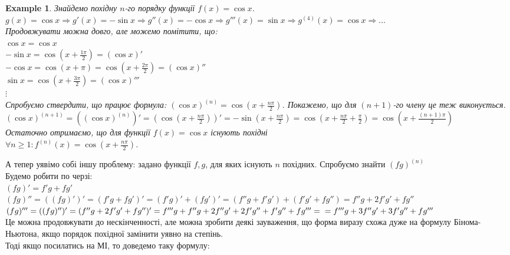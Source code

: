 \documentclass[a4paper, 14pt]{article}
\theoremstyle{theoremdd}
\theoremstyle{theoremdd}
\theoremstyle{theoremdd}
\theoremstyle{theoremdd}
\newtheorem{example}[theorem]{Example}
\theoremstyle{theoremdd}
\theoremstyle{theoremdd}
\theoremstyle{theoremdd}
\theoremstyle{theoremdd}
\begin{document}
\begin{example}
Знайдемо похідну $n$-го порядку функції $f(x) = \cos x$.\\
$g(x) = \cos x \Rightarrow g'(x) = -\sin x \Rightarrow g''(x) = -\cos x \Rightarrow g'''(x) = \sin x \Rightarrow g^{(4)}(x) = \cos x \Rightarrow \dots$\\
Продовжувати можна довго, але можемо помітити, що:\\
$\cos x = \cos x$\\
$- \sin x = \displaystyle \cos \left(x + \frac{1\pi}{2} \right) = (\cos x)'$\\
$- \cos x = \displaystyle \cos \left(x + \pi \right) = \cos \left(x + \frac{2 \pi}{2} \right) = (\cos x)''$\\
$ \sin x = \displaystyle \cos \left(x + \frac{3\pi}{2} \right) = (\cos x)'''$\\
$\vdots$\\
Спробуємо ствердити, що працює формула: $(\cos x)^{(n)} = \displaystyle \cos \left(x + \frac{n\pi}{2} \right)$. Покажемо, що для $(n+1)$-го члену це теж виконується.\\
$(\cos x)^{(n+1)} = \left((\cos x)^{(n)}\right)' = \displaystyle \left( \cos \left(x + \frac{n\pi}{2} \right) \right)' = -\sin \left(x + \frac{n\pi}{2} \right) = \cos \left(x + \frac{n\pi}{2} + \frac{\pi}{2} \right) = \cos \left(x + \frac{(n+1)\pi}{2} \right)$\\
Остаточно отримаємо, що для функції $f(x) = \cos x$ існують похідні\\
$\forall n \geq 1: f^{(n)}(x) = \displaystyle \cos \left(x + \frac{n\pi}{2} \right)$.
\end{example}

А тепер уявімо собі іншу проблему: задано функції $f,g$, для яких існують $n$ похідних. Спробуємо знайти $(fg)^{(n)}$\\
Будемо робити по черзі:\\
$(fg)' = f'g+fg'$\\
$(fg)''=((fg)')'=(f'g+fg')'=(f'g)'+(fg')'=(f''g+f'g')+(f'g'+fg'')= f''g + 2f'g' + fg''$\\
$(fg)''' = ((fg)'')' = (f''g + 2f'g' + fg'')' = f'''g+f''g+2f''g'+2f'g''+f'g''+fg''' = \\ = f'''g + 3f''g' + 3f'g'' + fg'''$\\
Це можна продовжувати до нескінченності, але можна зробити деякі зауваження, що форма виразу схожа дуже на формулу Бінома-Ньютона, якщо порядок похідної замінити уявно на степінь.\\
Тоді якщо посилатись на МІ, то доведемо таку формулу:
\end{document}
